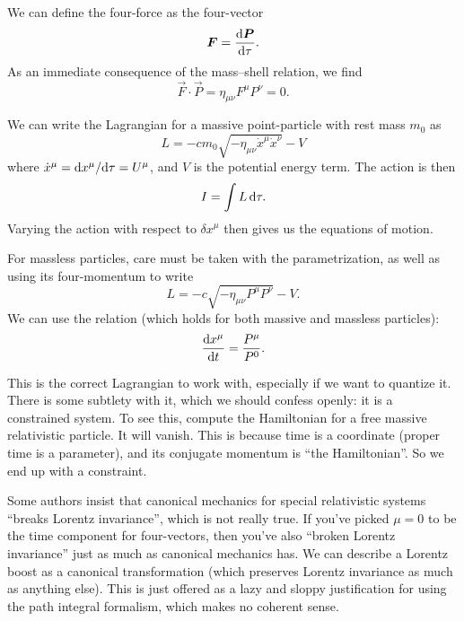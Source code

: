 We can define the four-force as the four-vector
\begin{equation}
\boldsymbol{F} = \frac{\mathrm{d}\boldsymbol{P}}{\mathrm{d}\tau}.
\end{equation}
As an immediate consequence of the mass--shell relation, we find
\begin{equation}
\vec{F}\cdot\vec{P} = \eta_{\mu\nu}F^{\mu}P^{\nu} = 0.
\end{equation}

We can write the Lagrangian for a massive point-particle with rest mass
$m_{0}$ as
\begin{equation}
L = -cm_{0}\sqrt{-\eta_{\mu\nu}\dot{x}^{\mu}\dot{x}^{\nu}} - V
\end{equation}
where $\dot{x}^{\mu} = \mathrm{d} x^{\mu}/\mathrm{d}\tau = U^{\mu}$, and $V$ is the potential
energy term. The action is then 
\begin{equation}
I = \int L\,\mathrm{d}\tau.
\end{equation}
Varying the action with respect to $\delta x^{\mu}$ then gives us the
equations of motion.

For massless particles, care must be taken with the parametrization, as
well as using its four-momentum to write
\begin{equation}
L = -c\sqrt{-\eta_{\mu\nu}P^{\mu}P^{\nu}} - V.
\end{equation}
We can use the relation (which holds for both massive and massless particles):
\begin{equation}
\frac{\mathrm{d} x^{\mu}}{\mathrm{d} t} = \frac{P^{\mu}}{P^{0}}.
\end{equation}

\begin{danger}
This is the correct Lagrangian to work with, especially if we want to
quantize it. There is some subtlety with it, which we should confess
openly: it is a constrained system. To see this, compute the Hamiltonian
for a free massive relativistic particle. It will vanish. This is
because time is a coordinate (proper time is a parameter), and its
conjugate momentum is ``the Hamiltonian''. So we end up with a
constraint. 
\end{danger}

\begin{ddanger}
Some authors insist that canonical mechanics for special relativistic
systems ``breaks Lorentz invariance'', which is not really true. If
you've picked $\mu=0$ to be the time component for four-vectors, then
you've also ``broken Lorentz invariance'' just as much as canonical
mechanics has. We can describe a Lorentz boost as a canonical
transformation (which preserves Lorentz invariance as much as anything
else). This is just offered as a lazy and sloppy justification for using
the path integral formalism, which makes no coherent sense.
\end{ddanger}

